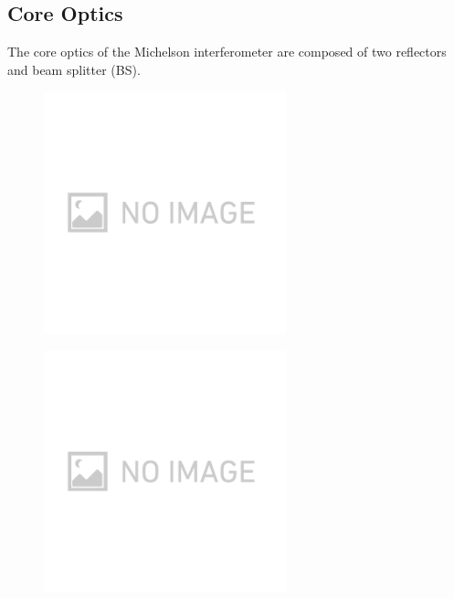 \subsection{Core Optics}
The core optics of the Michelson interferometer are composed of two reflectors and beam splitter (BS). 

\begin{figure}[h]
  \begin{minipage}[b]{7cm}
    \begin{center}   
      \includegraphics[width=7cm]{./img.png}
      \label{img:img418}
    \end{center}
  \end{minipage}\hspace{0.1cm}
  \begin{minipage}[b]{7cm}
    \begin{center}   
      \includegraphics[width=7cm]{./img.png}      
      \label{img:img419}
    \end{center}
  \end{minipage}
  \caption{}  
\end{figure}


